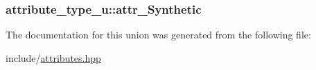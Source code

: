\hypertarget{unionattribute__type__u_a148433b2820836cd82e91bf47761812a}{
\subsubsection[{attr\+\_\+\+Synthetic}]{ attribute\+\_\+type\+\_\+u\+::attr\+\_\+\+Synthetic}}\label{unionattribute__type__u_a148433b2820836cd82e91bf47761812a}


The documentation for this union was generated from the following file\+:\begin{DoxyCompactItemize}
\item 
include/\hyperlink{attributes_8hpp}{attributes.\+hpp}\end{DoxyCompactItemize}
